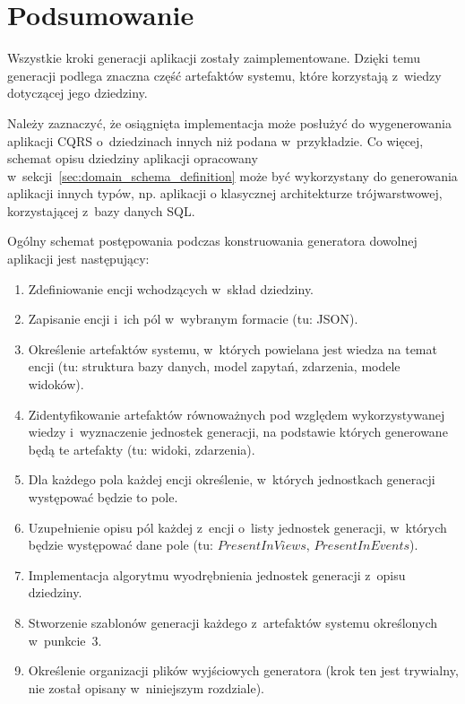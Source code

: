 \section{Podsumowanie}

Wszystkie kroki generacji aplikacji zostały zaimplementowane.
Dzięki temu generacji podlega znaczna część artefaktów systemu, które korzystają z~wiedzy dotyczącej jego dziedziny.

Należy zaznaczyć, że osiągnięta implementacja może posłużyć do wygenerowania aplikacji CQRS o~dziedzinach innych niż podana w~przykładzie.
Co więcej, schemat opisu dziedziny aplikacji opracowany w~sekcji~\ref{sec:domain_schema_definition} może być wykorzystany do generowania aplikacji innych typów, np. aplikacji o klasycznej architekturze trójwarstwowej, korzystającej z~bazy danych SQL.

Ogólny schemat postępowania podczas konstruowania generatora dowolnej aplikacji jest następujący:

\begin{enumerate}
 \item Zdefiniowanie encji wchodzących w~skład dziedziny.
 \item Zapisanie encji i~ich pól w~wybranym formacie (tu: JSON).
 \item Określenie artefaktów systemu, w~których powielana jest wiedza na temat encji (tu: struktura bazy danych, model zapytań, zdarzenia, modele widoków).
 \item Zidentyfikowanie artefaktów równoważnych pod względem wykorzystywanej wiedzy i~wyznaczenie jednostek generacji, na podstawie których generowane będą te artefakty (tu: widoki, zdarzenia).
 \item Dla każdego pola każdej encji określenie, w~których jednostkach generacji występować będzie to pole.
 \item Uzupełnienie opisu pól każdej z~encji o~listy jednostek generacji, w~których będzie występować dane pole (tu: $PresentInViews$, $PresentInEvents$).
 \item Implementacja algorytmu wyodrębnienia jednostek generacji z~opisu dziedziny.
 \item Stworzenie szablonów generacji każdego z~artefaktów systemu określonych w~punkcie~3.
 \item Określenie organizacji plików wyjściowych generatora (krok ten jest trywialny, nie został opisany w~niniejszym rozdziale).
\end{enumerate}
